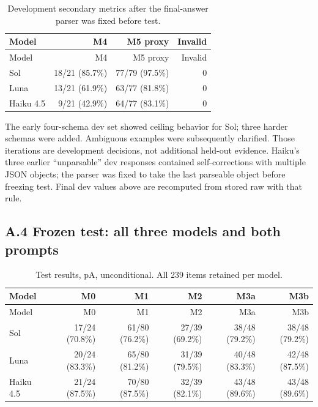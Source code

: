 \documentclass[11pt,a4paper]{article}
\begin{document}
\begingroup\small\setlength{\tabcolsep}{4pt}
\begin{longtable}{lrrr}
\caption{Development secondary metrics after the final-answer parser was fixed before test.}\\
\toprule
Model & M4 & M5 proxy & Invalid \\
\midrule\endfirsthead
\toprule
Model & M4 & M5 proxy & Invalid \\
\midrule\endhead
\bottomrule\endfoot
Sol & 18/21 (85.7\%) & 77/79 (97.5\%) & 0 \\
Luna & 13/21 (61.9\%) & 63/77 (81.8\%) & 0 \\
Haiku 4.5 & 9/21 (42.9\%) & 64/77 (83.1\%) & 0 \\
\end{longtable}\endgroup


The early four-schema dev set showed ceiling behavior for Sol; three harder schemas were added. Ambiguous examples were subsequently clarified. Those iterations are development decisions, not additional held-out evidence. Haiku's three earlier ``unparsable'' dev responses contained self-corrections with multiple JSON objects; the parser was fixed to take the last parseable object before freezing test. Final dev values above are recomputed from stored raw with that rule.

\subsection*{A.4 Frozen test: all three models and both prompts}

\begingroup\small\setlength{\tabcolsep}{4pt}
\begin{longtable}{lrrrrr}
\caption{Test results, pA, unconditional. All 239 items retained per model.}\\
\toprule
Model & M0 & M1 & M2 & M3a & M3b \\
\midrule\endfirsthead
\toprule
Model & M0 & M1 & M2 & M3a & M3b \\
\midrule\endhead
\bottomrule\endfoot
Sol & 17/24 (70.8\%) & 61/80 (76.2\%) & 27/39 (69.2\%) & 38/48 (79.2\%) & 38/48 (79.2\%) \\
Luna & 20/24 (83.3\%) & 65/80 (81.2\%) & 31/39 (79.5\%) & 40/48 (83.3\%) & 42/48 (87.5\%) \\
Haiku 4.5 & 21/24 (87.5\%) & 70/80 (87.5\%) & 32/39 (82.1\%) & 43/48 (89.6\%) & 43/48 (89.6\%) \\
\end{longtable}\endgroup
\end{document}
